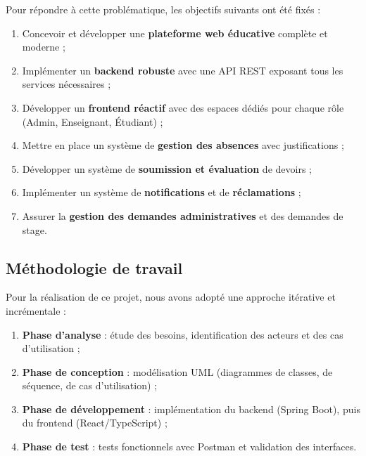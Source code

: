 Pour répondre à cette problématique, les objectifs suivants ont été fixés :
\begin{enumerate}[noitemsep]
    \item Concevoir et développer une \textbf{plateforme web éducative} complète et moderne ;
    \item Implémenter un \textbf{backend robuste} avec une API REST exposant tous les services nécessaires ;
    \item Développer un \textbf{frontend réactif} avec des espaces dédiés pour chaque rôle (Admin, Enseignant, Étudiant) ;
    \item Mettre en place un système de \textbf{gestion des absences} avec justifications ;
    \item Développer un système de \textbf{soumission et évaluation} de devoirs ;
    \item Implémenter un système de \textbf{notifications} et de \textbf{réclamations} ;
    \item Assurer la \textbf{gestion des demandes administratives} et des demandes de stage.
\end{enumerate}

\subsection*{Méthodologie de travail}

Pour la réalisation de ce projet, nous avons adopté une approche itérative et incrémentale :
\begin{enumerate}[noitemsep]
    \item \textbf{Phase d'analyse} : étude des besoins, identification des acteurs et des cas d'utilisation ;
    \item \textbf{Phase de conception} : modélisation UML (diagrammes de classes, de séquence, de cas d'utilisation) ;
    \item \textbf{Phase de développement} : implémentation du backend (Spring Boot), puis du frontend (React/TypeScript) ;
    \item \textbf{Phase de test} : tests fonctionnels avec Postman et validation des interfaces.
\end{enumerate}

\newpage

